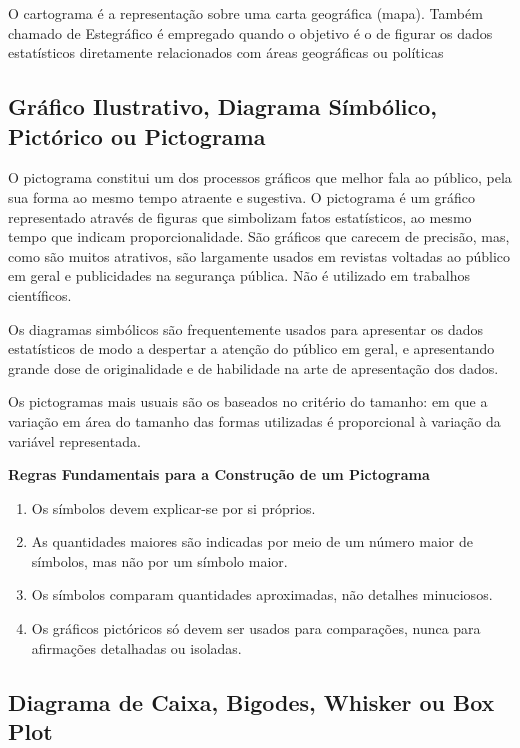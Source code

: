 O cartograma é a representação sobre uma carta geográfica (mapa).
Também chamado de Estegráfico é empregado quando o objetivo é o de
figurar os dados estatísticos diretamente relacionados com áreas
geográficas ou políticas


\newpage
\subsection{Gráfico Ilustrativo, Diagrama Símbólico, Pictórico ou Pictograma}

O pictograma constitui um dos processos gráficos que melhor fala
ao público, pela sua forma ao mesmo tempo atraente e sugestiva. O
pictograma é um gráfico representado através de figuras que
simbolizam fatos estatísticos, ao mesmo tempo que indicam
proporcionalidade. São gráficos que carecem de precisão, mas, como
são muitos atrativos, são largamente usados em revistas voltadas
ao público em geral e publicidades na segurança pública. Não é
utilizado em trabalhos científicos.\vskip0.3cm

Os diagramas simbólicos são frequentemente usados para apresentar os dados estatísticos de modo a despertar a atenção do público em geral, e apresentando grande dose de originalidade e de habilidade na arte de apresentação dos dados.\vskip0.3cm

Os pictogramas mais usuais são os baseados no critério do tamanho: em que a variação em área do tamanho das formas utilizadas é proporcional à variação da variável representada.\vskip0.3cm



\textbf{Regras Fundamentais para a Construção de um Pictograma}

\begin{enumerate}
    \item Os símbolos devem explicar-se por si próprios.
    \item As quantidades maiores são indicadas por meio de um
    número maior de símbolos, mas não por um símbolo maior.
    \item Os símbolos comparam quantidades aproximadas, não
    detalhes minuciosos.
    \item Os gráficos pictóricos só devem ser usados para
    comparações, nunca para afirmações detalhadas ou isoladas.
\end{enumerate}


\newpage 
\subsection{Diagrama de Caixa, Bigodes, Whisker ou Box Plot}

